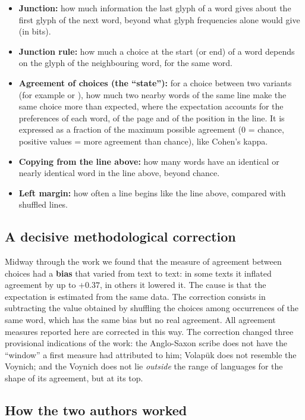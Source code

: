 \begin{itemize}
\item \textbf{Junction:} how much information the last glyph of a word gives about the first glyph of the next word,
  beyond what glyph frequencies alone would give (in bits).
\item \textbf{Junction rule:} how much a choice at the start (or end) of a word depends on the glyph of the neighbouring
  word, for the same word.
\item \textbf{Agreement of choices (the ``state''):} for a choice between two variants (for example  or ),
  how much two nearby words of the same line make the same choice more than expected, where the expectation accounts for
  the preferences of each word, of the page and of the position in the line. It is expressed as a fraction of the
  maximum possible agreement (0 = chance, positive values = more agreement than chance), like Cohen's kappa.
\item \textbf{Copying from the line above:} how many words have an identical or nearly identical word in the line above,
  beyond chance.
\item \textbf{Left margin:} how often a line begins like the line above, compared with shuffled lines.
\end{itemize}

\subsection{A decisive methodological correction}

Midway through the work we found that the measure of agreement between choices had a \textbf{bias} that varied from text
to text: in some texts it inflated agreement by up to $+0.37$, in others it lowered it. The cause is that the expectation
is estimated from the same data. The correction consists in subtracting the value obtained by shuffling the choices among
occurrences of the same word, which has the same bias but no real agreement. All agreement measures reported here are
corrected in this way. The correction changed three provisional indications of the work: the Anglo-Saxon scribe does not
have the ``window'' a first measure had attributed to him; Volapük does not resemble the Voynich; and the Voynich does
not lie \emph{outside} the range of languages for the shape of its agreement, but at its top.

\subsection{How the two authors worked}

